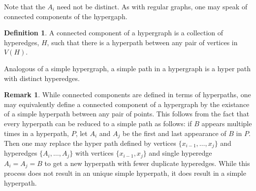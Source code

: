 \documentclass[11pt]{article}
\theoremstyle{remark}
\theoremstyle{definition}
\newtheorem{dfn}[thm]{Definition}
\newtheorem{rmk}[thm]{Remark}
\begin{document}
Note that the $A_i$ need not be distinct. As with regular graphs, one may speak of connected components of the hypergaph. 

\begin{dfn} \label{dfn:hyperedge}A connected component of a hypergraph is a collection of hyperedges, $H$, such that there is a hyperpath between any pair of vertices in $V(H)$. \end{dfn}

Analogous of a simple hypergraph, a simple path in a hypergraph is a hyper path with distinct hyperedges.

\begin{rmk} \label{rmk:hyperpathscontainsimple} While connected components are defined in terms of hyperpaths, one may equivalently define a connected component of a hypergraph by the existance of a simple hyperpath between any pair of points. This follows from the fact that every hyperpath can be reduced to a simple path as follows: if $B$ appears multiple times in a hyperpath, $P$, let $A_i$ and $A_j$ be the first and last appearance of $B$ in $P$. Then one may replace the hyper path defined by vertices $\{x_{i-1}, \ldots , x_j\}$ and hyperedges $\{A_i, \ldots, A_j\}$ with vertices $\{x_{i-1}, x_j\}$ and single hyperedge $A_i = A_j = B$ to get a new hyperpath with fewer duplicate hyperedges. While this process does not result in an unique simple hyperpath, it does result in a simple hyperpath. \end{rmk}
\end{document}
